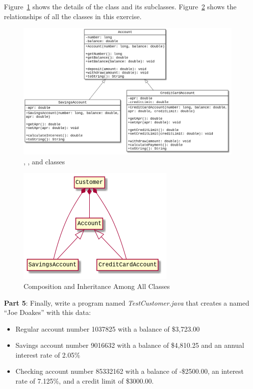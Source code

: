 \begin{exercise}
Figure~\ref{fig.inheritance1} shows the details of the  class and its subclasses. Figure~\ref{fig.inheritance2} shows the relationships of all the classes in this exercise.

\begin{figure}[!ht]
\begin{center}
\includegraphics[scale=0.4]{figs/ch14/account_inheritance.png}
\caption{, , and  classes}
\label{fig.inheritance1}
\end{center}
\end{figure}

\begin{figure}[!ht]
\begin{center}
\includegraphics[scale=0.7]{figs/ch14/account_classes.png}
\caption{Composition and Inheritance Among All Classes}
\label{fig.inheritance2}
\end{center}
\end{figure}

{\bf Part 5}: Finally, write a program named {\em TestCustomer.java} that creates a  named ``Joe Doakes'' with this data:

\begin{itemize}
\item Regular account number 1037825 with a balance of \$3,723.00
\item Savings account number 9016632 with a balance of \$4,810.25 and an annual interest rate of 2.05\%
\item Checking account number 85332162 with a balance of -\$2500.00, an interest rate of 7.125\%, and a credit limit of \$3000.00.
\end{itemize}


\end{exercise}
